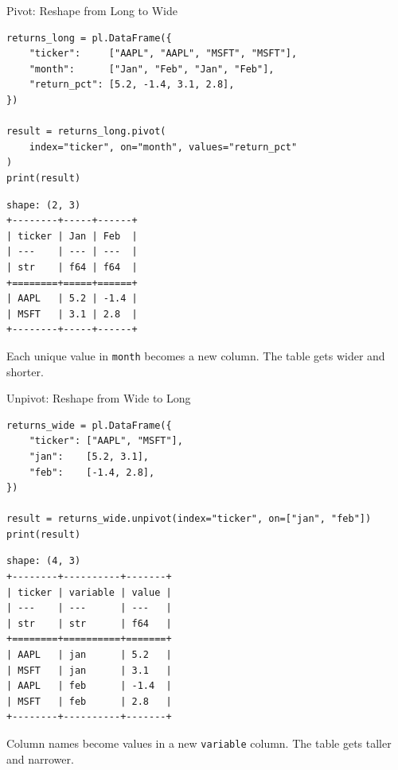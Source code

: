 \documentclass[9pt,aspectratio=169]{beamer}
\begin{document}
\begin{frame}[fragile]{Pivot: Reshape from Long to Wide}

\begin{lstlisting}
returns_long = pl.DataFrame({
    "ticker":     ["AAPL", "AAPL", "MSFT", "MSFT"],
    "month":      ["Jan", "Feb", "Jan", "Feb"],
    "return_pct": [5.2, -1.4, 3.1, 2.8],
})

result = returns_long.pivot(
    index="ticker", on="month", values="return_pct"
)
print(result)
\end{lstlisting}

\begin{lstlisting}[style=output]
shape: (2, 3)
+--------+-----+------+
| ticker | Jan | Feb  |
| ---    | --- | ---  |
| str    | f64 | f64  |
+========+=====+======+
| AAPL   | 5.2 | -1.4 |
| MSFT   | 3.1 | 2.8  |
+--------+-----+------+
\end{lstlisting}

Each unique value in \texttt{month} becomes a new column. The table gets wider and shorter.

\end{frame}


\begin{frame}[fragile]{Unpivot: Reshape from Wide to Long}

\begin{lstlisting}
returns_wide = pl.DataFrame({
    "ticker": ["AAPL", "MSFT"],
    "jan":    [5.2, 3.1],
    "feb":    [-1.4, 2.8],
})

result = returns_wide.unpivot(index="ticker", on=["jan", "feb"])
print(result)
\end{lstlisting}

\begin{lstlisting}[style=output]
shape: (4, 3)
+--------+----------+-------+
| ticker | variable | value |
| ---    | ---      | ---   |
| str    | str      | f64   |
+========+==========+=======+
| AAPL   | jan      | 5.2   |
| MSFT   | jan      | 3.1   |
| AAPL   | feb      | -1.4  |
| MSFT   | feb      | 2.8   |
+--------+----------+-------+
\end{lstlisting}

Column names become values in a new \texttt{variable} column. The table gets taller and narrower.

\end{frame}
\end{document}
